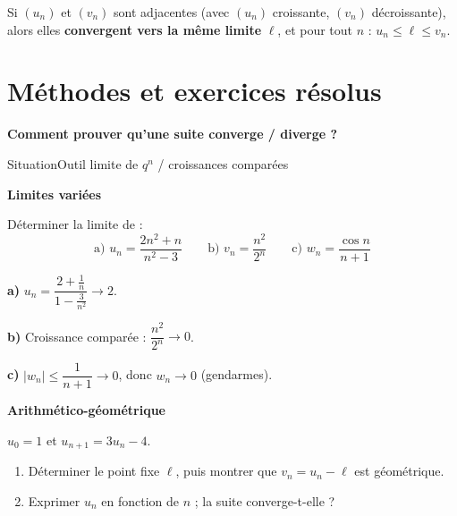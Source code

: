 \begin{theoreme}
	Si $(u_n)$ et $(v_n)$ sont adjacentes (avec $(u_n)$ croissante,
	$(v_n)$ décroissante), alors elles \textbf{convergent vers la même
	limite} $\ell$, et pour tout $n$ : $u_n\leq\ell\leq v_n$.
\end{theoreme}


\section{Méthodes et exercices résolus}

\begin{methode}
	\textbf{Comment prouver qu'une suite converge / diverge ?}
	\begin{tabmethode}[0.52]{Situation}{Outil}
		      {limite de $q^{n}$ / croissances comparées}
	\end{tabmethode}
\end{methode}

\exerciceresolu
\textbf{Limites variées}

Déterminer la limite de :
\[
\text{a) } u_n=\frac{2n^{2}+n}{n^{2}-3}
\qquad
\text{b) } v_n=\frac{n^{2}}{2^{n}}
\qquad
\text{c) } w_n=\frac{\cos n}{n+1}
\]

\solution

\textbf{a)} $u_n=\dfrac{2+\frac1n}{1-\frac{3}{n^{2}}}\to 2$.

\textbf{b)} Croissance comparée : $\dfrac{n^{2}}{2^{n}}\to 0$.

\textbf{c)} $\bigl|w_n\bigr|\leq\dfrac{1}{n+1}\to 0$, donc $w_n\to 0$
(gendarmes).

\bigskip
\exerciceresolu
\textbf{Arithmético-géométrique}

$u_0=1$ et $u_{n+1}=3u_n-4$.
\begin{enumerate}
	\item Déterminer le point fixe $\ell$, puis montrer que $v_n=u_n-\ell$ est
	géométrique.
	\item Exprimer $u_n$ en fonction de $n$ ; la suite converge-t-elle ?
\end{enumerate}

